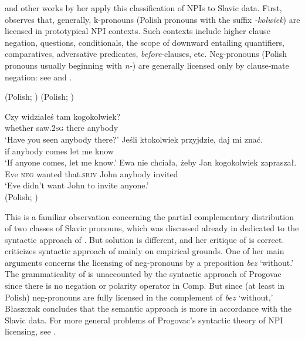 \documentclass[output=paper,colorlinks,citecolor=brown]{langscibook}
\begin{document}
\citet{Blaszczak2001} and other works by her apply this classification of NPIs to Slavic data. First, \citeauthor{Blaszczak2001} observes that, generally, k-pronouns (Polish pronouns with the suffix \emph{-kolwiek}) are licensed in prototypical NPI contexts. Such contexts include higher clause negation, questions, conditionals, the scope of downward entailing quantifiers, comparatives, adversative predicates, \emph{before}-clauses, etc. Neg-pronouns (Polish pronouns usually beginning with \emph{n-}) are generally licensed only by clause-mate negation: see  and .

\ea\label{ex:28}\hfill(Polish; \citealt[2]{blaszczak2003negative})
\hfill(Polish; \citealt[2]{blaszczak2003negative})
\z
\z

\ea\label{ex:29}\ea \gll Czy widziałeś tam kogokolwiek?\\
whether saw.\textsc{2sg} there anybody\\
\glt `Have you seen anybody there?'
\ex \gll Jeśli ktokolwiek przyjdzie, daj mi znać.\\
if anybody comes let me know\\
\glt `If anyone comes, let me know.'
\ex \gll Ewa nie chciała, żeby Jan kogokolwiek zapraszał.\\
Eve \textsc{neg} wanted that.\textsc{sbjv} John anybody invited\\
\glt `Eve didn't want John to invite anyone.'\\\hfill (Polish; \citealt[2]{blaszczak2003negative})
\z
\z

\noindent This is a familiar observation concerning the partial complementary distribution of two classes of Slavic pronouns, which was discussed already in  dedicated to the syntactic approach of \citet{progovac1994negative}. But  solution is different, and her critique of \citet{Progovac1993a} is correct. \citet{Blaszczak2001} criticizes syntactic approach of \citet{Progovac1993a} mainly on empirical grounds. One of her main arguments concerns the licensing of neg-pronouns by a preposition \textit{bez} `without.' The grammaticality of  is unaccounted by the syntactic approach of Progovac since there is no negation or polarity operator in Comp. But since (at least in Polish) neg-pronouns are fully licensed in the complement of \textit{bez} `without,' B{\l}aszczak concludes that the semantic approach is more in accordance with the Slavic data. For more general problems of Progovac's syntactic theory of NPI licensing, see .
\end{document}
